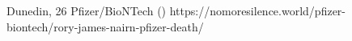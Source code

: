           {Dunedin, }
          {26}
          {Pfizer/BioNTech}
          {}
          {
             ()
          }
          {https://nomoresilence.world/pfizer-biontech/rory-james-nairn-pfizer-death/}

